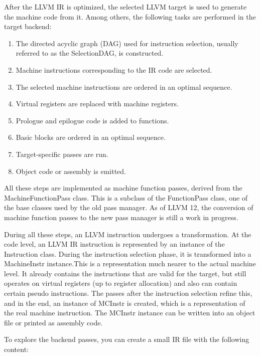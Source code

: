 After the LLVM IR is optimized, the selected LLVM target is used to generate the machine code from it. Among others, the following tasks are performed in the target backend:\par

\begin{enumerate}
\item The directed acyclic graph (DAG) used for instruction selection, usually referred to as the SelectionDAG, is constructed.
\item Machine instructions corresponding to the IR code are selected.
\item The selected machine instructions are ordered in an optimal sequence.
\item Virtual registers are replaced with machine registers.
\item Prologue and epilogue code is added to functions.
\item Basic blocks are ordered in an optimal sequence.
\item Target-specific passes are run.
\item Object code or assembly is emitted.
\end{enumerate}

All these steps are implemented as machine function passes, derived from the MachineFunctionPass class. This is a subclass of the FunctionPass class, one of the base classes used by the old pass manager. As of LLVM 12, the conversion of machine function passes to the new pass manager is still a work in progress.
\par

During all these steps, an LLVM instruction undergoes a transformation. At the code level, an LLVM IR instruction is represented by an instance of the Instruction class. During the instruction selection phase, it is transformed into a MachineInstr instance.This is a representation much nearer to the actual machine level. It already contains the instructions that are valid for the target, but still operates on virtual registers (up to register allocation) and also can contain certain pseudo instructions. The passes after the instruction selection refine this, and in the end, an instance of MCInstr is created, which is a representation of the real machine instruction. The MCInstr instance can be written into an object file or printed as assembly code.\par

To explore the backend passes, you can create a small IR file with the following content:\par


